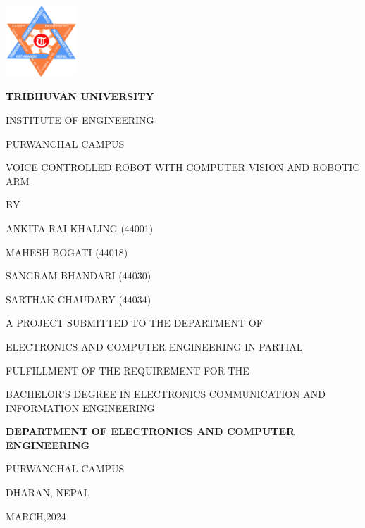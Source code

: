 \begin{titlepage}
    \centering
    
    \includegraphics[width=0.2\textwidth]{Graphics/TULogo.png}\par
    \vspace{1.2cm}
    {\fontsize{14pt}{12pt}\selectfont\bfseries\textcolor{black}
    TRIBHUVAN UNIVERSITY \par INSTITUTE OF ENGINEERING \par PURWANCHAL CAMPUS \par
    \vspace{1.2cm}
    \begin{flushleft}
    
    \end{flushleft}

    \par VOICE CONTROLLED ROBOT WITH COMPUTER VISION AND ROBOTIC ARM \par

    \vspace{1.2cm}
    BY\par ANKITA RAI KHALING (44001)
    \par MAHESH BOGATI (44018)
      \par SANGRAM BHANDARI (44030)
      \par SARTHAK CHAUDARY (44034)
    \par
    \vspace{0.5cm}
    A PROJECT SUBMITTED TO THE DEPARTMENT OF\par ELECTRONICS AND COMPUTER ENGINEERING IN PARTIAL \par FULFILLMENT OF THE REQUIREMENT FOR THE  \par BACHELOR’S DEGREE IN ELECTRONICS COMMUNICATION AND INFORMATION ENGINEERING\par
    \vspace{1.0cm}\par
    }
    {\fontsize{13pt}{12pt}\selectfont\bfseries\textcolor{black}
    DEPARTMENT OF ELECTRONICS AND COMPUTER ENGINEERING\par PURWANCHAL CAMPUS\par DHARAN, NEPAL\par
    MARCH,2024 
    }
\end{titlepage}

